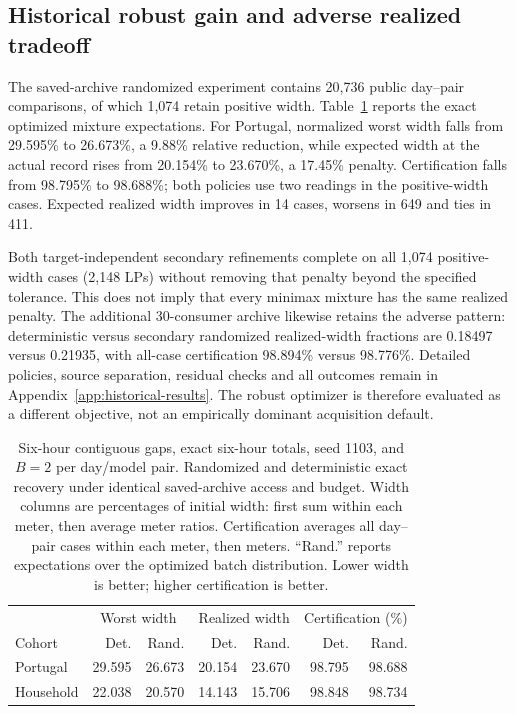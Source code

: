 \documentclass[12pt]{article}
\begin{document}
\subsection{Historical robust gain and adverse realized tradeoff}
The saved-archive randomized experiment contains 20,736 public day--pair
comparisons, of which 1,074 retain positive width. Table~\ref{tab:random-results}
reports the exact optimized mixture expectations. For Portugal, normalized
worst width falls from 29.595\% to 26.673\%, a 9.88\% relative reduction,
while expected width at the actual record rises from 20.154\% to 23.670\%,
a 17.45\% penalty. Certification falls from 98.795\% to 98.688\%; both
policies use two readings in the positive-width cases. Expected realized
width improves in 14 cases, worsens in 649 and ties in 411.

Both target-independent secondary refinements complete on all 1,074
positive-width cases (2,148 LPs) without removing that penalty beyond the
specified tolerance. This does not imply that every minimax mixture has
the same realized penalty. The additional 30-consumer archive likewise
retains the adverse pattern: deterministic versus secondary randomized
realized-width fractions are 0.18497 versus 0.21935, with all-case
certification 98.894\% versus 98.776\%. Detailed policies, source separation,
residual checks and all outcomes remain in
Appendix~\ref{app:historical-results}. The robust optimizer is therefore
evaluated as a different objective, not an empirically dominant acquisition
default.

\begin{table}[htbp]\centering\small
\caption{Six-hour contiguous gaps, exact six-hour totals, seed 1103, and $B=2$ per day/model pair. Randomized and deterministic exact recovery under identical saved-archive
access and budget. Width columns are percentages of initial width: first sum
within each meter, then average meter ratios. Certification averages all
day--pair cases within each meter, then meters. ``Rand.'' reports expectations
over the optimized batch distribution. Lower width is better; higher
certification is better.}\label{tab:random-results}
\begin{tabular}{lrrrrrr}\toprule
&\multicolumn{2}{c}{Worst width}&\multicolumn{2}{c}{Realized width}&\multicolumn{2}{c}{Certification (\%)}\\
Cohort&Det.&Rand.&Det.&Rand.&Det.&Rand.\\\midrule
Portugal & 29.595 & 26.673 & 20.154 & 23.670 & 98.795 & 98.688 \\
Household & 22.038 & 20.570 & 14.143 & 15.706 & 98.848 & 98.734 \\
\bottomrule\end{tabular}\end{table}
\FloatBarrier
\end{document}
